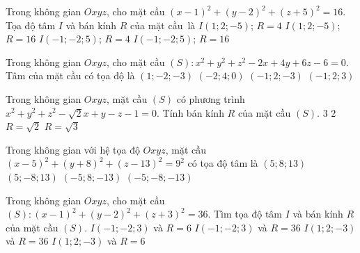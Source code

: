 \begin{ex}%
	Trong không gian $Oxyz$, cho mặt cầu $(x-1)^2+(y-2)^2+(z+5)^2=16$. Tọa độ  tâm $I$ và bán kính $R$ của mặt cầu~là
	\choice 
		 {\True $I(1;2;-5)$; $R=4$}
		 {$I(1;2;-5)$; $R=16$}
		{$I(-1;-2;5)$; $R=4$} 
		 {$I(-1;-2;5)$; $R=16$}
\end{ex}

\begin{ex}%
	Trong không gian $Oxyz$, cho mặt cầu $(S)\colon x^2+y^2+z^2-2x+4y+6z-6=0$. Tâm của mặt cầu  có tọa độ là
	 \choice
		{\True $(1;-2;-3)$} 
		{$(-2;4;0)$} 
		 {$(-1;2;-3)$}
		{$(-1;2;3)$} 
\end{ex}

\begin{ex}%
	Trong không gian $Oxyz$, mặt cầu $(S)$ có phương  trình $x^2+y^2+z^2-\sqrt{2}x+y-z-1=0$. Tính bán kính $R$ của mặt cầu $(S)$.
	 \choice
		{$3$} 
		 {$2$}
		 {\True $R=\sqrt{2}$}
		{$R=\sqrt{3}$} 
\end{ex}

\begin{ex}%
	 Trong không gian với hệ tọa độ $Oxyz$, mặt cầu $(x-5)^2+(y+8)^2+(z-13)^2=9^2$ có tọa độ tâm là
	\choice 
		{$(5;8;13)$} 
		 {\True $(5;-8;13)$}
		 {$(-5;8;-13)$}
		 {$(-5;-8;-13)$}
\end{ex}

\begin{ex}%
	Trong không gian  $Oxyz$, cho mặt cầu $(S)\colon(x-1)^2+(y-2)^2+(z+3)^2=36$. Tìm tọa độ tâm $I$ và bán kính $R$ của mặt cầu $(S)$.
	\choice 
		{$I(-1;-2;3)$  và $R=6$}
		 {$I(-1;-2;3)$ và $R=36$}
		 {$I(1;2;-3)$ và $R=36$}
		{\True  $I(1;2;-3)$ và $R=6$}
\end{ex}

